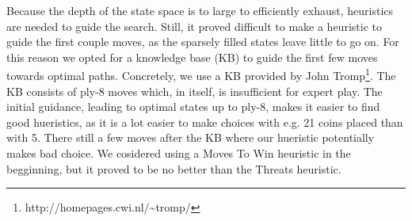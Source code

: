 Because the depth of the state space is to large to efficiently exhaust,
heuristics are needed to guide the search. Still, it proved difficult to make a
heuristic to guide the first couple moves, as the sparsely filled states leave
little to go on. For this reason we opted for a knowledge base (KB) to guide the
first few moves towards optimal paths. Concretely, we use a KB provided by John
Tromp\footnote{http://homepages.cwi.nl/\textasciitilde tromp/}. The KB consists
of ply-8 moves which, in itself, is insufficient for expert play. The initial
guidance, leading to optimal states up to ply-8, makes it easier to find good
hueristics, as it is a lot easier to make choices with e.g. 21 coins placed than
with 5. There still a few moves after the KB where our hueristic potentially
makes bad choice. We cosidered using a Moves To Win heuristic in the begginning,
but it proved to be no better than the Threats heuristic.
